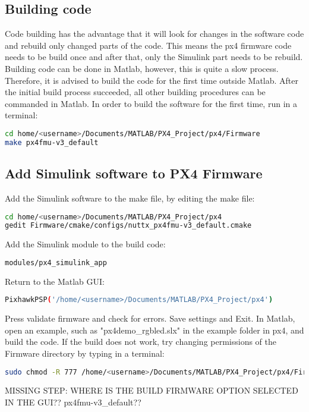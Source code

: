 \subsection{Building code}
Code building has the advantage that it will look for changes in the software code and rebuild only changed parts of the code. This means the px4 firmware code needs to be build once and after that, only the Simulink part needs to be rebuild.\\
\newline
Building code can be done in Matlab, however, this is quite a slow process. Therefore, it is advised to build the code for the first time outside Matlab. After the initial build process succeeded, all other building procedures can be commanded in Matlab. In order to build the software for the first time, run in a terminal:
\begin{lstlisting}[language=sh]
cd home/<username>/Documents/MATLAB/PX4_Project/px4/Firmware
make px4fmu-v3_default
\end{lstlisting}
\subsection{Add Simulink software to PX4 Firmware}
Add the Simulink software to the make file, by editing the make file:
\begin{lstlisting}[language=sh]
cd home/<username>/Documents/MATLAB/PX4_Project/px4
gedit Firmware/cmake/configs/nuttx_px4fmu-v3_default.cmake
\end{lstlisting}
Add the Simulink module to the build code:
\begin{lstlisting}[language=sh]
modules/px4_simulink_app
\end{lstlisting}
Return to the Matlab GUI:
\begin{lstlisting}[language=sh]
PixhawkPSP('/home/<username>/Documents/MATLAB/PX4_Project/px4')
\end{lstlisting}
Press validate firmware and check for errors. Save settings and Exit.
In Matlab, open an example, such as "px4demo\_rgbled.slx" in the example folder  in px4, and build the code. If the build does not work, try changing permissions of the Firmware directory by typing in a terminal:
\begin{lstlisting}[language=sh]
sudo chmod -R 777 /home/<username>/Documents/MATLAB/PX4_Project/px4/Firmware
\end{lstlisting}
\color{red}
MISSING STEP: WHERE IS THE BUILD FIRMWARE OPTION SELECTED IN THE GUI?? px4fmu-v3\_default??
\color{black}
